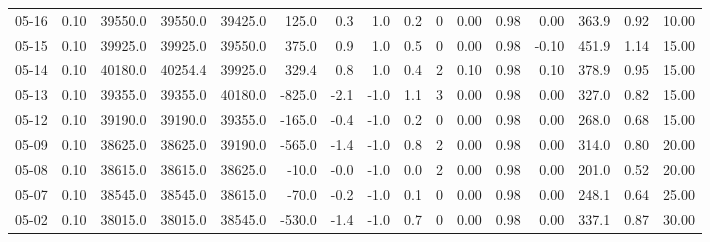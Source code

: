 \begin{threeparttable}
{\begin{tabular}{lrrrrrrrrrrrrrrr}
  05-16 &     0.10 & 39550.0 & 39550.0 & 39425.0 &      125.0 &            0.3 &                      1.0 &                 0.2 &              0 &       0.00 &      0.98 &           0.00 &            363.9 &            0.92 &                  10.00 \\
  05-15 &     0.10 & 39925.0 & 39925.0 & 39550.0 &      375.0 &            0.9 &                      1.0 &                 0.5 &              0 &       0.00 &      0.98 &          -0.10 &            451.9 &            1.14 &                  15.00 \\
  05-14 &     0.10 & 40180.0 & 40254.4 & 39925.0 &      329.4 &            0.8 &                      1.0 &                 0.4 &              2 &       0.10 &      0.98 &           0.10 &            378.9 &            0.95 &                  15.00 \\
  05-13 &     0.10 & 39355.0 & 39355.0 & 40180.0 &     -825.0 &           -2.1 &                     -1.0 &                 1.1 &              3 &       0.00 &      0.98 &           0.00 &            327.0 &            0.82 &                  15.00 \\
  05-12 &     0.10 & 39190.0 & 39190.0 & 39355.0 &     -165.0 &           -0.4 &                     -1.0 &                 0.2 &              0 &       0.00 &      0.98 &           0.00 &            268.0 &            0.68 &                  15.00 \\
  05-09 &     0.10 & 38625.0 & 38625.0 & 39190.0 &     -565.0 &           -1.4 &                     -1.0 &                 0.8 &              2 &       0.00 &      0.98 &           0.00 &            314.0 &            0.80 &                  20.00 \\
  05-08 &     0.10 & 38615.0 & 38615.0 & 38625.0 &      -10.0 &           -0.0 &                     -1.0 &                 0.0 &              2 &       0.00 &      0.98 &           0.00 &            201.0 &            0.52 &                  20.00 \\
  05-07 &     0.10 & 38545.0 & 38545.0 & 38615.0 &      -70.0 &           -0.2 &                     -1.0 &                 0.1 &              0 &       0.00 &      0.98 &           0.00 &            248.1 &            0.64 &                  25.00 \\
  05-02 &     0.10 & 38015.0 & 38015.0 & 38545.0 &     -530.0 &           -1.4 &                     -1.0 &                 0.7 &              0 &       0.00 &      0.98 &           0.00 &            337.1 &            0.87 &                  30.00 \\

\end{tabular}}
\end{threeparttable}
